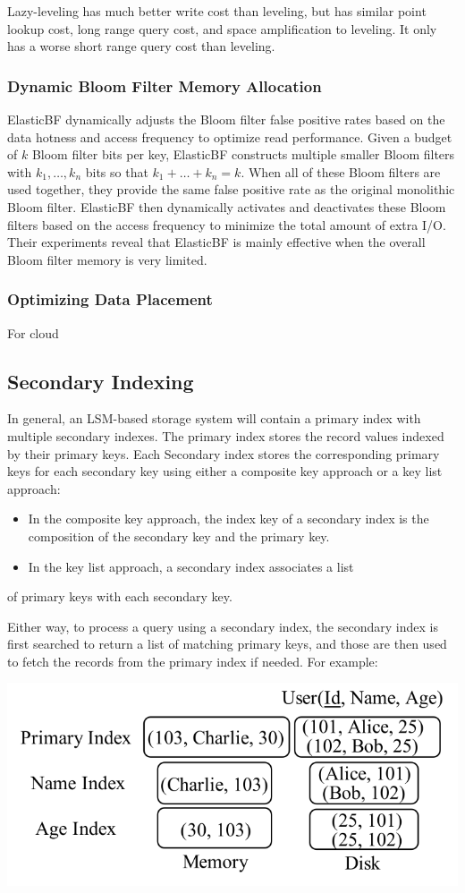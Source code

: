 \documentclass[11pt]{article}
\begin{document}
Lazy-leveling has much better write cost than leveling, but has similar point lookup cost, long range
query cost, and space amplification to leveling. It only has a worse short range query cost than
leveling.
\subsubsection{Dynamic Bloom Filter Memory Allocation}
\label{sec:org831ebde}
ElasticBF dynamically adjusts the Bloom filter false positive rates based on the data hotness and
access frequency to optimize read performance. Given a budget of \(k\) Bloom filter bits per key,
ElasticBF constructs multiple smaller Bloom filters with \(k_1,\dots,k_n\) bits so that
\(k_1+\dots+k_n=k\). When all of these Bloom filters are used together, they provide the same false
positive rate as the original monolithic Bloom filter. ElasticBF then dynamically activates and
deactivates these Bloom filters based on the access frequency to minimize the total amount of extra
I/O. Their experiments reveal that ElasticBF is mainly effective when the overall Bloom filter memory is very limited.
\subsubsection{Optimizing Data Placement}
\label{sec:org694bb06}
For cloud
\subsection{Secondary Indexing}
\label{sec:orgb70854c}
In general, an LSM-based storage system will contain a primary index with multiple secondary indexes.
The primary index stores the record values indexed by their primary keys. Each Secondary index stores
the corresponding primary keys for each secondary key using either a composite key approach or a key
list approach:
\begin{itemize}
\item In the composite key approach, the index key of a secondary index is the composition of the
secondary key and the primary key.
\item In the key list approach, a secondary index associates a list
\end{itemize}
of primary keys with each secondary key.

Either way, to process a query using a secondary index, the secondary index is first searched to
return a list of matching primary keys, and those are then used to fetch the records from the primary
index if needed. For example:
\begin{center}
\includegraphics[width=.8\textwidth]{../../images/db/14.png}
\end{center}
\end{document}
